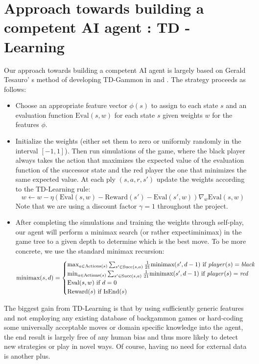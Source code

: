 \documentclass[11pt, a4paper, twoside]{amsart} %
\theoremstyle{definition}
\begin{document}
\section{Approach towards building a competent AI agent : TD - Learning}

Our approach towards building a competent AI agent is largely based on Gerald Tesauro' s method of developing TD-Gammon in \citep{TDGammon} and \citep{TDGammon2}. The strategy proceeds as follows:
\begin{itemize}
\item Choose an appropriate feature vector $\phi(s)$ to assign to each state $s$ and an evaluation function $\text{Eval}(s, w)$ for each state $s$ given weights $w$ for the features $\phi$.
\item Initialize the weights (either set them to zero or uniformly randomly in the interval $[-1, 1]$). Then run simulations of the game, where the black player always takes the action that maximizes the expected value of the evaluation function of the successor state and the red player the one that minimizes the same expected value. At each ply $(s, a, r, s')$ update the weights according to the TD-Learning rule:
$$ w \leftarrow w - \eta \left( \text{Eval}(s, w) - \text{Reward}(s') - \text{Eval}(s', w) \right) \nabla_{w} \text{Eval}(s, w)$$ 
Note that we are using a discount factor $\gamma = 1$ throughout the project.
\item After completing the simulations and training the weights through self-play, our agent will perform a minimax search (or rather expectiminimax) in the game tree to a given depth to determine which is the best move. To be more concrete, we use the standard minimax recursion:
\[ \text{minimax}(s, d) = \begin{cases}
		\max_{a \in \text{Actions}(s)} \sum_{s' \in \text{Succ}(s,a)} \frac{1}{21} \text{minimax}(s', d - 1) \ \text{if} \ \text{\emph{player}}(s) = \text{\emph{black}} \\
		\min_{a \in \text{Actions}(s)} \sum_{s' \in \text{Succ}(s,a)} \frac{1}{21} \text{minimax}(s', d - 1) \ \text{if} \ \text{\emph{player}}(s) = \text{\emph{red}} \\
		\text{Eval}(s, w)  \ \text{if} \ d=0 \\
		\text{Reward}(s)  \ \text{if} \ \text{IsEnd}(s)
		\end{cases}
		\]
\end{itemize}
The biggest gain from TD-Learning is that by using sufficiently generic features and not employing any existing database of backgammon games or hard-coding some universally acceptable moves or domain specific knowledge into the agent, the end result is largely free of any human bias and thus more likely to detect new strategies or play in novel ways. Of course, having no need for external data is another plus.\\
\end{document}
